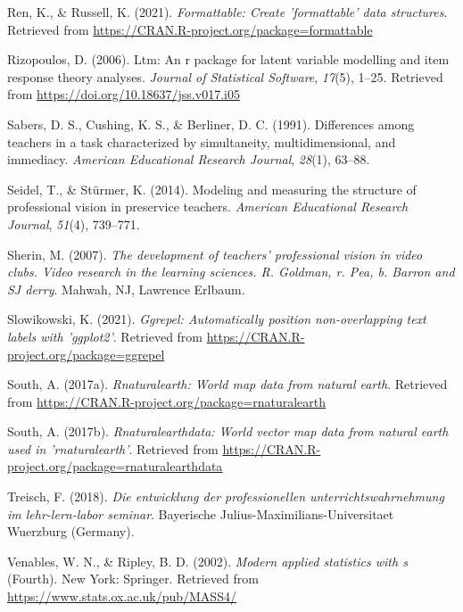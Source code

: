 \documentclass[
  man]{apa6}
\newlength{\cslhangindent}
\newenvironment{CSLReferences}[2] %
 {\begin{list}{}{%
  \setlength{\itemindent}{0pt}
  \setlength{\leftmargin}{0pt}
  \setlength{\parsep}{0pt}
  \ifodd #1
   \setlength{\leftmargin}{\cslhangindent}
   \setlength{\itemindent}{-1\cslhangindent}
  \fi
  \setlength{\itemsep}{#2\baselineskip}}}
 {\end{list}}
\begin{document}
\begin{CSLReferences}{1}{0}
Ren, K., \& Russell, K. (2021). \emph{Formattable: Create 'formattable' data structures}. Retrieved from \url{https://CRAN.R-project.org/package=formattable}

Rizopoulos, D. (2006). Ltm: An r package for latent variable modelling and item response theory analyses. \emph{Journal of Statistical Software}, \emph{17}(5), 1--25. Retrieved from \url{https://doi.org/10.18637/jss.v017.i05}

Sabers, D. S., Cushing, K. S., \& Berliner, D. C. (1991). Differences among teachers in a task characterized by simultaneity, multidimensional, and immediacy. \emph{American Educational Research Journal}, \emph{28}(1), 63--88.

Seidel, T., \& Stürmer, K. (2014). Modeling and measuring the structure of professional vision in preservice teachers. \emph{American Educational Research Journal}, \emph{51}(4), 739--771.

Sherin, M. (2007). \emph{The development of teachers' professional vision in video clubs. Video research in the learning sciences. R. Goldman, r. Pea, b. Barron and SJ derry}. Mahwah, NJ, Lawrence Erlbaum.

Slowikowski, K. (2021). \emph{Ggrepel: Automatically position non-overlapping text labels with 'ggplot2'}. Retrieved from \url{https://CRAN.R-project.org/package=ggrepel}

South, A. (2017a). \emph{Rnaturalearth: World map data from natural earth}. Retrieved from \url{https://CRAN.R-project.org/package=rnaturalearth}

South, A. (2017b). \emph{Rnaturalearthdata: World vector map data from natural earth used in 'rnaturalearth'}. Retrieved from \url{https://CRAN.R-project.org/package=rnaturalearthdata}

Treisch, F. (2018). \emph{Die entwicklung der professionellen unterrichtswahrnehmung im lehr-lern-labor seminar}. Bayerische Julius-Maximilians-Universitaet Wuerzburg (Germany).

Venables, W. N., \& Ripley, B. D. (2002). \emph{Modern applied statistics with s} (Fourth). New York: Springer. Retrieved from \url{https://www.stats.ox.ac.uk/pub/MASS4/}


\end{CSLReferences}
\end{document}
